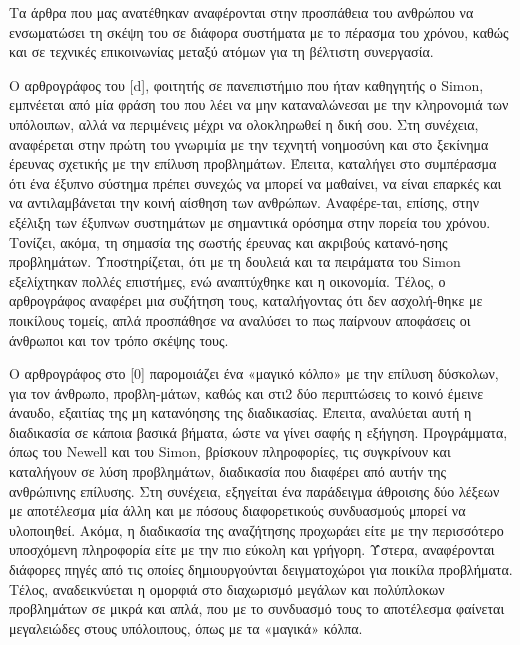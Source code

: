 \documentclass[12pt]{article}
\begin{document}
\begin{abstract*}
    Τα άρθρα που μας ανατέθηκαν αναφέρονται στην προσπάθεια του ανθρώπου να ενσωματώσει τη σκέψη του σε διάφορα συστήματα με το πέρασμα του χρόνου, καθώς και σε τεχνικές επικοινωνίας μεταξύ ατόμων για τη βέλτιστη συνεργασία.  
    
    Ο αρθρογράφος του [d], φοιτητής σε πανεπιστήμιο που ήταν καθηγητής ο Simon, εμπνέεται από μία φράση του που λέει να μην καταναλώνεσαι με την κληρονομιά των υπόλοιπων, αλλά να περιμένεις μέχρι να ολοκληρωθεί η δική σου. Στη συνέχεια, αναφέρεται στην πρώτη του γνωριμία με την τεχνητή νοημοσύνη και στο ξεκίνημα έρευνας σχετικής με την επίλυση προβλημάτων. Έπειτα, καταλήγει στο συμπέρασμα ότι ένα έξυπνο σύστημα πρέπει συνεχώς να μπορεί να μαθαίνει, να είναι επαρκές και να αντιλαμβάνεται την κοινή αίσθηση των ανθρώπων. Αναφέρε-ται, επίσης, στην εξέλιξη των έξυπνων συστημάτων με σημαντικά ορόσημα στην πορεία του χρόνου. Τονίζει, ακόμα, τη σημασία της σωστής έρευνας και ακριβούς κατανό-ησης προβλημάτων. Υποστηρίζεται, ότι με τη δουλειά και τα πειράματα του Simon εξελίχτηκαν πολλές επιστήμες, ενώ αναπτύχθηκε και η οικονομία. Τέλος, ο αρθρογράφος αναφέρει μια συζήτηση τους, καταλήγοντας ότι δεν ασχολή-θηκε με ποικίλους τομείς, απλά προσπάθησε να αναλύσει το πως παίρνουν αποφάσεις οι άνθρωποι και τον τρόπο σκέψης τους.

   Ο αρθρογράφος στο [0] παρομοιάζει ένα «μαγικό κόλπο» με την επίλυση δύσκολων, για τον άνθρωπο, προβλη-μάτων, καθώς και στι2 δύο περιπτώσεις το κοινό έμεινε άναυδο, εξαιτίας της μη κατανόησης της διαδικασίας. Έπειτα, αναλύεται αυτή η διαδικασία σε κάποια βασικά βήματα, ώστε να γίνει σαφής η εξήγηση. Προγράμματα, όπως του Newell και του Simon, βρίσκουν πληροφορίες, τις συγκρίνουν και καταλήγουν σε λύση προβλημάτων, διαδικασία που διαφέρει από αυτήν της ανθρώπινης επίλυσης. Στη συνέχεια, εξηγείται ένα παράδειγμα άθροισης δύο λέξεων με αποτέλεσμα μία άλλη και με πόσους διαφορετικούς συνδυασμούς μπορεί να υλοποιηθεί. Ακόμα, η διαδικασία της αναζήτησης προχωράει είτε με την περισσότερο υποσχόμενη πληροφορία είτε με την πιο εύκολη και γρήγορη. Ύστερα, αναφέρονται διάφορες πηγές από τις οποίες δημιουργούνται δειγματοχώροι για ποικίλα προβλήματα. Τέλος, αναδεικνύεται η ομορφιά στο διαχωρισμό μεγάλων και πολύπλοκων προβλημάτων σε μικρά και απλά, που με το συνδυασμό τους το αποτέλεσμα φαίνεται μεγαλειώδες στους υπόλοιπους, όπως με τα «μαγικά» κόλπα. 


\end{abstract*}
\end{document}
